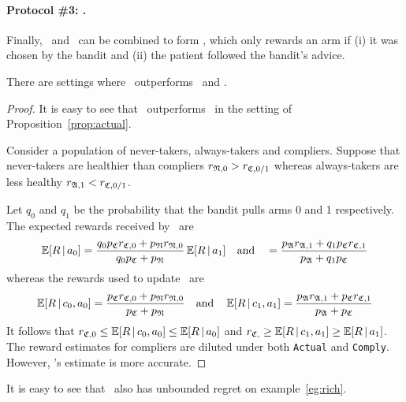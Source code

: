 \paragraph{Protocol \#3: \comply.}
Finally, \chosen\, and \actual\, can be combined to form \comply, which only rewards an arm if (i) it was chosen by the bandit and (ii) the patient followed the bandit's advice.

\begin{prop}\label{prop:comply}
	There are settings where \comply\, outperforms \chosen\, and \actual.
\end{prop}

\begin{proof}
	It is easy to see that \comply\, outperforms \chosen\, in the setting of Proposition~\ref{prop:actual}.
	
	Consider a population of never-takers, always-takers and compliers. Suppose that never-takers are healthier than compliers $r_{{\mathfrak N},0}> r_{{\mathfrak C},0/1}$ whereas always-takers are less healthy $r_{{\mathfrak A},1}<r_{{\mathfrak C},0/1}$.  
	
	Let $q_0$ and $q_1$ be the probability that the bandit pulls arms 0 and 1 respectively. The expected rewards received by \actual\, are
	\begin{equation}
		\operatorname*{\mathbb E}[R\,|\,a_0]
		 = \frac{q_0 p_{{\mathfrak C}}r_{{\mathfrak C},0} + p_{\mathfrak N} r_{{\mathfrak N},0}}{q_0p_{\mathfrak C} + p_{\mathfrak N}}		
		\operatorname*{\mathbb E}[R\,|\,a_1]
		\quad\text{and}\quad
		 = \frac{p_{\mathfrak A} r_{{\mathfrak A},1} + q_1p_{\mathfrak C} r_{{\mathfrak C},1}}{p_{\mathfrak A} + q_1 p_{\mathfrak C}}
	\end{equation}
	whereas the rewards used to update \comply\, are
	\begin{align}
		\operatorname*{\mathbb E}[R\,|\,c_0,a_0] = \frac{p_{{\mathfrak C}}r_{{\mathfrak C},0} + p_{\mathfrak N} r_{{\mathfrak N},0}}{p_{\mathfrak C} + p_{\mathfrak N}}
		\quad\text{and}\quad
		\operatorname*{\mathbb E}[R\,|\,c_1,a_1] = \frac{p_{\mathfrak A} r_{{\mathfrak A},1} + p_{{\mathfrak C}}r_{{\mathfrak C},1}}{p_{\mathfrak A} + p_{\mathfrak C}}
	\end{align}
	It follows that $r_{{\mathfrak C},0} \leq\operatorname*{\mathbb E}[R\,|\,c_0,a_0]\leq \operatorname*{\mathbb E}[R\,|\,a_0]$ and $r_{{\mathfrak C},} \geq\operatorname*{\mathbb E}[R\,|\,c_1,a_1] \geq \operatorname*{\mathbb E}[R\,|\,a_1]$.
	The reward estimates for compliers are diluted under both \texttt{Actual} and \texttt{Comply}. However, \comply's estimate is more accurate.
\end{proof}

It is easy to see that \comply\, also has unbounded regret on example~\ref{eg:rich}.


